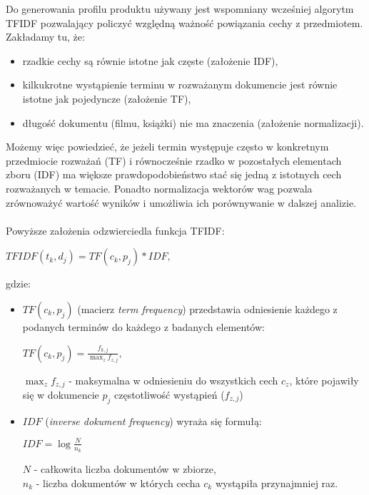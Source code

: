 \documentclass[12pt,a4paper]{report}
\begin{document}
Do generowania profilu produktu używany jest wspomniany wcześniej algorytm TFIDF pozwalający policzyć względną ważność powiązania cechy z przedmiotem. Zakładamy tu, że:
\begin{itemize}
\item rzadkie cechy są równie istotne jak częste (założenie IDF),
\item kilkukrotne wystąpienie terminu w rozważanym dokumencie jest równie istotne jak pojedyncze (założenie TF),
\item długość dokumentu (filmu, książki) nie ma znaczenia (założenie normalizacji).  
\end{itemize}
Możemy więc powiedzieć, że jeżeli termin występuje często w konkretnym przedmiocie rozważań (TF) i równocześnie rzadko w pozostałych elementach zboru (IDF) ma większe prawdopodobieństwo stać się jedną z istotnych cech rozważanych w temacie. Ponadto normalizacja wektorów wag pozwala zrównoważyć wartość wyników i umożliwia ich porównywanie w dalszej analizie.
\\
\\Powyższe założenia odzwierciedla funkcja TFIDF:
\begin{center}
\begin{math}
TFIDF(t_k, d_j) = TF(c_k, p_j) * IDF,
\end{math}
\end{center}
gdzie:
\begin{itemize}
\item \begin{math}TF(c_k, p_j)  \end{math} (macierz \textit{term frequency}) przedstawia odniesienie każdego z podanych terminów do każdego z badanych elementów:
\begin{center}
\begin{math}
TF(c_k, p_j)=\frac{f_{k,j}}{\max_{z}f_{z,j}},
\end{math}
\end{center}
$\max_{z}f_{z,j}$ - maksymalna w odniesieniu do wszystkich cech $c_z$, które pojawiły się w dokumencie $p_j$ częstotliwość wystąpień ($f_{z,j}$) 

\item \begin{math}IDF \end{math} (\textit{inverse dokument frequency}) wyraża się formułą:
\begin{center}
\begin{math}IDF = \log \frac{N}{n_k} \end{math}
\end{center}
$N$ - całkowita liczba dokumentów w zbiorze,
\\$n_k$ - liczba dokumentów w których cecha $c_k$ wystąpiła przynajmniej raz.
\end{itemize}
\end{document}
